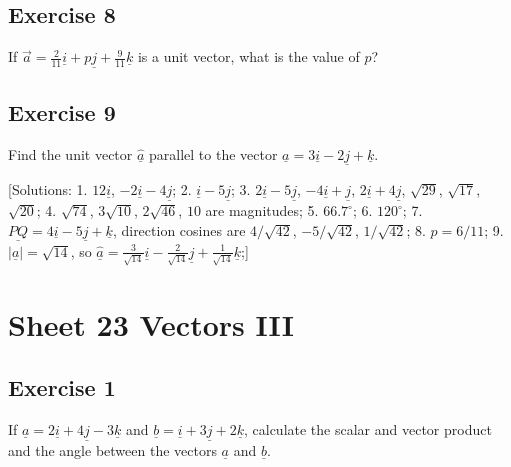 \documentclass[
  11pt,
  oneside]{book}
\newcommand{\slide}{}
\theoremstyle{definition}
\theoremstyle{definition}
\theoremstyle{definition}
\theoremstyle{definition}
\theoremstyle{remark}
\begin{document}
\slide

\subsection*{Exercise 8}\label{exercise-8-1}

If \(\vec{a}=\frac2{11}\underline{i}+p\underline{j}+\frac9{11}\underline{k}\) is a unit vector, what is the value of \(p\)?

\slide

\subsection*{Exercise 9}\label{exercise-9-1}

Find the unit vector \(\hat{\underline{a}}\) parallel to the vector \(\underline a=3\underline{i}-2\underline{j}+\underline{k}\).

{[}Solutions:
1. \(12\underline{i}\), \(-2\underline{i}-4\underline{j}\);
2. \(\underline{i}-5\underline{j}\);
3. \(2\underline{i}-5\underline{j}\), \(-4\underline{i}+\underline{j}\), \(2\underline{i}+4\underline{j}\), \(\sqrt{29}\), \(\sqrt{17}\), \(\sqrt{20}\);
4. \(\sqrt{74}\), \(3\sqrt{10}\), \(2\sqrt{46}\), \(10\) are magnitudes;
5. \(66.7^{\circ}\);
6. \(120^{\circ}\);
7. \(\underline{PQ}=4\underline{i}-5\underline{j}+\underline{k}\), direction cosines are \(4/\sqrt{42}\), \(-5/\sqrt{42}\), \(1/\sqrt{42}\);
8. \(p=6/11\);
9. \(|\underline{a}|=\sqrt{14}\), so \(\hat{\underline{a}}=\frac{3}{\sqrt{14}}\underline{i} - \frac{2}{\sqrt{14}}\underline{j} + \frac{1}{\sqrt{14}}\underline{k}\);{]}

\slide

\section{Sheet 23 Vectors III}\label{sheet-23-vectors-iii}

\subsection*{Exercise 1}\label{exercise-1-14}

If \(\underline{a} = 2\underline{i} + 4\underline{j} - 3\underline{k}\) and \(\underline{b} = \underline{i} + 3\underline{j} + 2\underline{k}\), calculate the scalar and vector product and the angle between the vectors \(\underline{a}\) and \(\underline{b}\).
\end{document}

